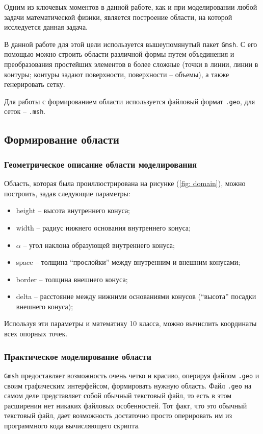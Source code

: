 \documentclass[a4paper, 14pt]{extreport}
\begin{document}
Одним из ключевых моментов в данной работе, как и при моделировании 
любой задачи математической физики, является построение области, 
на которой исследуется данная задача.

В данной работе для этой цели используется вышеупомянутый пакет
 \texttt{Gmsh}. С его помощью можно строить области различной формы
 путем объединения и преобразования простейших элементов в более 
 сложные (точки в линии, линии в контуры; контуры задают поверхности,
  поверхности -- объемы), а также генерировать сетку.

Для работы с формированием области используется файловый формат 
\texttt{.geo}, для сеток -- \texttt{.msh}.

\subsection{Формирование области}
\subsubsection{Геометрическое описание области моделирования}

Область, которая была проиллюстрирована на рисунке (\ref{fig: domain}),
можно построить, задав следующие параметры:
\begin{itemize}
	\item height -- высота внутреннего конуса;
	\item width -- радиус нижнего основания внутреннего конуса;
	\item $\alpha$ -- угол наклона образующей внутреннего конуса;
	\item space -- толщина \enquote{прослойки} между внутренним и внешним 
	конусами;
	\item border -- толщина внешнего конуса;
	\item delta -- расстояние между нижними основаниями конусов 
	(\enquote{высота} посадки внешнего конуса);
\end{itemize}

Используя эти параметры и математику 10 класса,
можно вычислить координаты всех опорных точек.

\subsubsection{Практическое моделирование области}

\texttt{Gmsh} предоставляет возможность очень четко и красиво,
 оперируя файлом \texttt{.geo} и своим графическим интерфейсом,  
формировать нужную область.
Файл \texttt{.geo} на самом деле представляет собой обычный текстовый файл, то есть в этом расширении нет никаких файловых особенностей.
Тот факт, что это обычный текстовый файл, дает возможность достаточно просто оперировать им из программного кода вычисляющего скрипта.
\end{document}
